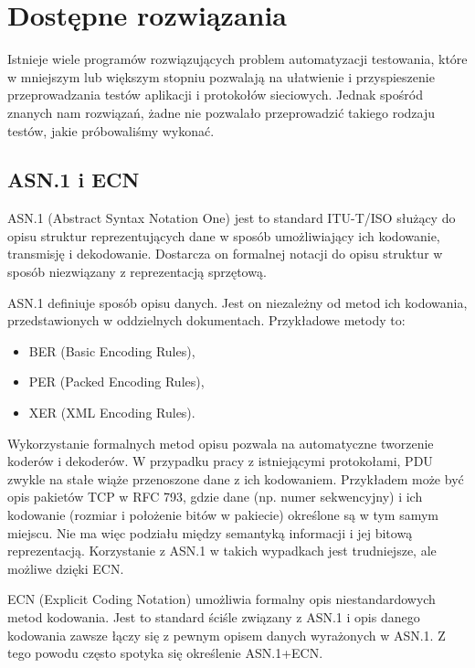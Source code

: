 \documentclass[00-praca-magisterska.tex]{subfiles}
\begin{document}

\section{Dostępne rozwiązania}


Istnieje wiele programów rozwiązujących problem automatyzacji testowania, które
w mniejszym lub większym stopniu pozwalają na ułatwienie i przyspieszenie
przeprowadzania testów aplikacji i protokołów sieciowych. Jednak spośród znanych
nam rozwiązań, żadne nie pozwalało przeprowadzić takiego rodzaju testów, jakie
próbowaliśmy wykonać.

\subsection{ASN.1 i ECN}
ASN.1 (Abstract Syntax Notation One) jest to standard ITU-T/ISO służący do opisu
struktur reprezentujących dane w sposób umożliwiający ich kodowanie, transmisję
i dekodowanie. Dostarcza on formalnej notacji do opisu struktur w sposób
niezwiązany z reprezentacją sprzętową.

ASN.1 definiuje sposób opisu danych. Jest on niezależny od metod ich kodowania,
przedstawionych w oddzielnych dokumentach. Przykładowe metody to:
\begin{itemize}
\item BER (Basic Encoding Rules),
\item PER (Packed Encoding Rules),
\item XER (XML Encoding Rules).
\end{itemize}

Wykorzystanie formalnych metod opisu pozwala na automatyczne tworzenie koderów i
dekoderów. W przypadku pracy z istniejącymi protokołami, PDU zwykle na stałe
wiąże przenoszone dane z ich kodowaniem. Przykładem może być opis pakietów TCP w
RFC 793, gdzie dane (np. numer sekwencyjny) i ich kodowanie (rozmiar i
położenie bitów w pakiecie) określone są w tym samym miejscu. Nie ma więc podziału między semantyką informacji i jej bitową reprezentacją. Korzystanie z ASN.1 w takich wypadkach jest
trudniejsze, ale możliwe dzięki ECN.

ECN (Explicit Coding Notation) umożliwia formalny opis niestandardowych metod
kodowania. Jest to standard ściśle związany z ASN.1 i opis danego kodowania
zawsze łączy się z pewnym opisem danych wyrażonych w ASN.1. Z tego powodu często
spotyka się określenie ASN.1+ECN.
\end{document}
